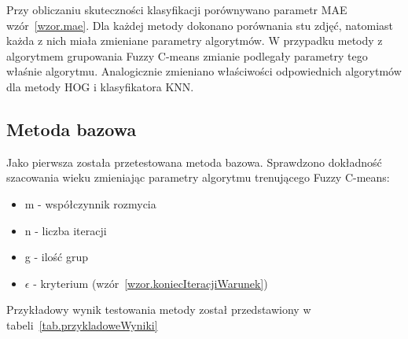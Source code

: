 \documentclass[a4paper,twoside,12pt]{book}
\begin{document}
    Przy obliczaniu skuteczności klasyfikacji porównywano parametr MAE wzór~\ref{wzor.mae}.
    Dla każdej metody dokonano porównania stu zdjęć,
    natomiast każda z nich miała zmieniane parametry algorytmów. W przypadku metody z algorytmem grupowania Fuzzy C-means zmianie
    podlegały parametry tego właśnie algorytmu. Analogicznie zmieniano właściwości odpowiednich algorytmów dla metody HOG i klasyfikatora KNN.

    \subsection{Metoda bazowa}\label{subsec:metoda-bazowa}
    Jako pierwsza została przetestowana metoda bazowa.
    Sprawdzono dokładność szacowania wieku zmieniając parametry algorytmu trenującego Fuzzy C-means:
    \begin{itemize}
        \item m - współczynnik rozmycia
        \item n - liczba iteracji
        \item g - ilość grup
        \item $\epsilon$ - kryterium (wzór~\ref{wzor.koniecIteracjiWarunek})
    \end{itemize}

    Przykładowy wynik testowania metody został przedstawiony w tabeli~\ref{tab.przykladoweWyniki}
\end{document}
